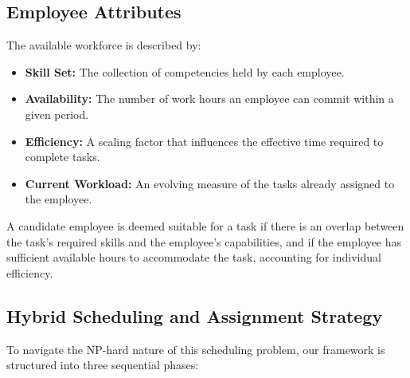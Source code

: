 \documentclass[%
aip,
cp,  %
amsmath,amssymb,
reprint,%
]{revtex4-2}
\begin{document}
	\subsection{\label{subsec:employee}Employee Attributes}
	
	The available workforce is described by:
	\begin{itemize}
		\item \textbf{Skill Set:} The collection of competencies held by each
		employee.
		
		\item \textbf{Availability:} The number of work hours an employee can commit
		within a given period.
		
		\item \textbf{Efficiency:} A scaling factor that influences the effective
		time required to complete tasks.
		
		\item \textbf{Current Workload:} An evolving measure of the tasks already
		assigned to the employee.
	\end{itemize}
	A candidate employee is deemed suitable for a task if there is an overlap between
	the task's required skills and the employee's capabilities, and if the
	employee has sufficient available hours to accommodate the task, accounting for
	individual efficiency.
	
	\subsection{\label{subsec:strategy}Hybrid Scheduling and Assignment Strategy}
	
	To navigate the NP-hard nature of this scheduling problem, our framework is structured
	into three sequential phases:
	
\end{document}
